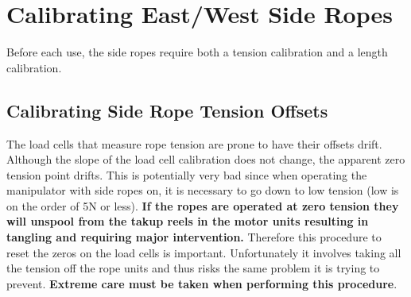 \documentclass[11pt]{article}
\begin{document}
\section{Calibrating East/West Side Ropes}

Before each use, the side ropes require both a tension calibration and a length calibration.

\subsection{Calibrating Side Rope Tension Offsets}
The load cells that measure rope tension are prone to have their offsets drift. Although the slope of the load cell calibration does not change, the apparent zero tension point drifts. This is potentially very bad since when operating the manipulator with side ropes on, it is necessary to go down to low tension (low is on the order of 5N or less).
{\bf If the ropes are operated at zero tension they will unspool from the takup reels in the motor units resulting in tangling and requiring major intervention.}
Therefore this procedure to reset the zeros on the load cells is important. Unfortunately it involves taking all the tension off the rope units and thus risks the same problem it is trying to prevent.
{\bf Extreme care must be taken when performing this procedure}.
\end{document}

